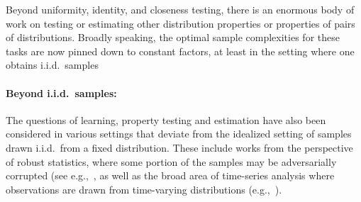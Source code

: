 \documentclass[10pt]{article} %
\theoremstyle{plain}
\begin{document}
Beyond uniformity, identity, and closeness testing, there is an enormous body of work on testing or estimating other distribution properties or properties of pairs of distributions.  Broadly speaking, the optimal sample complexities for these tasks are now pinned down to constant factors, at least in the setting where one obtains i.i.d.\ samples







\paragraph{Beyond i.i.d.\ samples:}
The questions of learning, property testing and estimation have also been considered in various settings that deviate from the idealized setting of samples drawn i.i.d.\ from a fixed distribution.  These include works from the perspective of robust statistics, where some portion of the samples may be adversarially corrupted (see e.g.,~\cite{diakonikolas2019robust, diakonikolas2019recent, charikar2017learning}, as well as the broad area of time-series analysis where observations are drawn from time-varying distributions (e.g.,~\cite{chernoff1964estimating,kolar2010estimating, lampert2015predicting}).  
\end{document}
